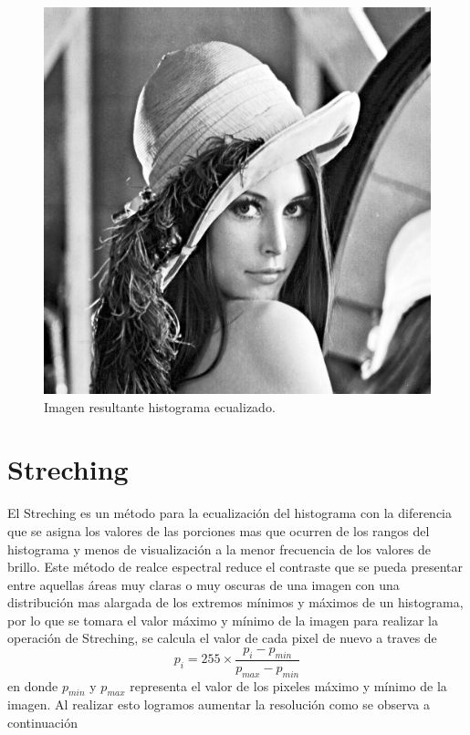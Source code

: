 \begin{figure}[H]
	\centering
	\includegraphics[scale=0.5]{imagenes/ecualidazorHistograma.png}

	\caption{Imagen resultante histograma ecualizado\label{fig:ecImg}.}
\end{figure}

\section{Streching}

	El Streching es un método para la ecualización del histograma con la diferencia que se asigna los valores de las porciones mas que ocurren de los rangos del histograma y menos de visualización a la menor frecuencia de los valores de brillo. Este método de realce espectral reduce el contraste que se pueda presentar entre aquellas áreas muy claras o muy oscuras de una imagen con una distribución mas alargada de los extremos mínimos y máximos de un histograma, por lo que se tomara el valor máximo y mínimo de la imagen para realizar la operación de Streching, se calcula el valor de cada pixel de nuevo a traves de 
\begin{equation}
	p_i = 255 \times \frac{p_i-p_{min}}{p_{max}-p_{min}}
\end{equation}
en donde $p_{min}$ y $p_{max}$ representa el valor de los pixeles máximo y mínimo de la imagen. Al realizar esto logramos aumentar la resolución como se observa a continuación

